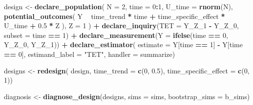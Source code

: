 \documentclass[
]{article}
\newenvironment{Shaded}{\begin{snugshade}}{\end{snugshade}}
\newcommand{\DataTypeTok}[1]{\textcolor[rgb]{0.13,0.29,0.53}{#1}}
\newcommand{\DecValTok}[1]{\textcolor[rgb]{0.00,0.00,0.81}{#1}}
\newcommand{\FloatTok}[1]{\textcolor[rgb]{0.00,0.00,0.81}{#1}}
\newcommand{\KeywordTok}[1]{\textcolor[rgb]{0.13,0.29,0.53}{\textbf{#1}}}
\newcommand{\NormalTok}[1]{#1}
\newcommand{\OperatorTok}[1]{\textcolor[rgb]{0.81,0.36,0.00}{\textbf{#1}}}
\newcommand{\StringTok}[1]{\textcolor[rgb]{0.31,0.60,0.02}{#1}}
\begin{document}
\begin{Shaded}
\begin{Highlighting}[]
\NormalTok{design <-}\StringTok{ }
\StringTok{  }\KeywordTok{declare_population}\NormalTok{(}
    \DataTypeTok{N =} \DecValTok{2}\NormalTok{, }
    \DataTypeTok{time =} \DecValTok{0}\OperatorTok{:}\DecValTok{1}\NormalTok{,}
    \DataTypeTok{U_time =} \KeywordTok{rnorm}\NormalTok{(N),}
    \KeywordTok{potential_outcomes}\NormalTok{(}
\NormalTok{      Y }\OperatorTok{~}\StringTok{ }\NormalTok{time_trend }\OperatorTok{*}\StringTok{ }\NormalTok{time }\OperatorTok{+}\StringTok{ }\NormalTok{time_specific_effect }\OperatorTok{*}\StringTok{ }\NormalTok{U_time }\OperatorTok{+}\StringTok{ }\FloatTok{0.5} \OperatorTok{*}\StringTok{ }\NormalTok{Z}
\NormalTok{    ),}
    \DataTypeTok{Z =} \DecValTok{1}
\NormalTok{  ) }\OperatorTok{+}\StringTok{ }
\StringTok{  }\KeywordTok{declare_inquiry}\NormalTok{(}\DataTypeTok{TET =}\NormalTok{ Y_Z_}\DecValTok{1} \OperatorTok{-}\StringTok{ }\NormalTok{Y_Z_}\DecValTok{0}\NormalTok{, }\DataTypeTok{subset =}\NormalTok{ time }\OperatorTok{==}\StringTok{ }\DecValTok{1}\NormalTok{) }\OperatorTok{+}\StringTok{ }
\StringTok{  }\KeywordTok{declare_measurement}\NormalTok{(}\DataTypeTok{Y =} \KeywordTok{ifelse}\NormalTok{(time }\OperatorTok{==}\StringTok{ }\DecValTok{0}\NormalTok{, Y_Z_}\DecValTok{0}\NormalTok{, Y_Z_}\DecValTok{1}\NormalTok{)) }\OperatorTok{+}\StringTok{ }
\StringTok{  }\KeywordTok{declare_estimator}\NormalTok{(}
    \DataTypeTok{estimate =}\NormalTok{ Y[time }\OperatorTok{==}\StringTok{ }\DecValTok{1}\NormalTok{] }\OperatorTok{-}\StringTok{ }\NormalTok{Y[time }\OperatorTok{==}\StringTok{ }\DecValTok{0}\NormalTok{], }
    \DataTypeTok{estimand_label =} \StringTok{"TET"}\NormalTok{, }\DataTypeTok{handler =}\NormalTok{ summarize)}

\NormalTok{designs <-}\StringTok{ }\KeywordTok{redesign}\NormalTok{(}
\NormalTok{  design, }\DataTypeTok{time_trend =} \KeywordTok{c}\NormalTok{(}\DecValTok{0}\NormalTok{, }\FloatTok{0.5}\NormalTok{), }\DataTypeTok{time_specific_effect =} \KeywordTok{c}\NormalTok{(}\DecValTok{0}\NormalTok{, }\DecValTok{1}\NormalTok{))}
\end{Highlighting}
\end{Shaded}

\begin{Shaded}
\begin{Highlighting}[]
\NormalTok{diagnosis <-}\StringTok{ }\KeywordTok{diagnose_design}\NormalTok{(designs, }\DataTypeTok{sims =}\NormalTok{ sims, }\DataTypeTok{bootstrap_sims =}\NormalTok{ b_sims)}
\end{Highlighting}
\end{Shaded}
\end{document}
